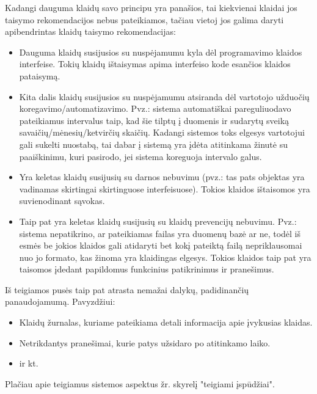 Kadangi dauguma klaidų savo principu yra panašios, tai kiekvienai klaidai jos taisymo
rekomendacijos nebus pateikiamos, tačiau vietoj jos galima daryti apibendrintas klaidų
taisymo rekomendacijas:
\begin{itemize}
  \item Dauguma klaidų susijusios su nuspėjamumu kyla dėl programavimo klaidos interfeise.
  Tokių klaidų ištaisymas apima interfeiso kode esančios klaidos pataisymą.
  \item Kita dalis klaidų susijusios su nuspėjamumu atsiranda dėl vartotojo užduočių
  koregavimo/automatizavimo. Pvz.: sistema automatiškai pareguliuodavo pateikiamus intervalus
  taip, kad šie tilptų į duomenis ir sudarytų sveiką savaičių/mėnesių/ketvirčių skaičių.
  Kadangi sistemos toks elgesys vartotojui gali sukelti nuostabą, tai dabar į sistemą yra
  įdėta atitinkama žinutė su paaiškinimu, kuri pasirodo, jei sistema koreguoja intervalo galus.
  \item Yra keletas klaidų susijusių su darnos nebuvimu (pvz.: tas pats objektas yra vadinamas
  skirtingai skirtinguose interfeisuose). Tokios klaidos ištaisomos yra suvienodinant sąvokas.
  \item Taip pat yra keletas klaidų susijusių su klaidų prevencijų nebuvimu. Pvz.: sistema nepatikrino, ar pateikiamas failas yra duomenų bazė ar ne, todėl iš esmės be jokios klaidos gali atidaryti bet kokį pateiktą failą nepriklausomai nuo jo formato, kas žinoma yra klaidingas elgesys. Tokios klaidos taip pat yra taisomos įdedant papildomus funkcinius patikrinimus ir pranešimus.
\end{itemize}

\vspace{1cm}
Iš teigiamos pusės taip pat atrasta nemažai dalykų, padidinančių panaudojamumą. Pavyzdžiui:
\begin{itemize}
  \item Klaidų žurnalas, kuriame pateikiama detali informacija apie įvykusias klaidas.
  \item Netrikdantys pranešimai, kurie patys užsidaro po atitinkamo laiko.
  \item ir kt.
\end{itemize}

Plačiau apie teigiamus sistemos aspektus žr. skyrelį "teigiami įspūdžiai".

